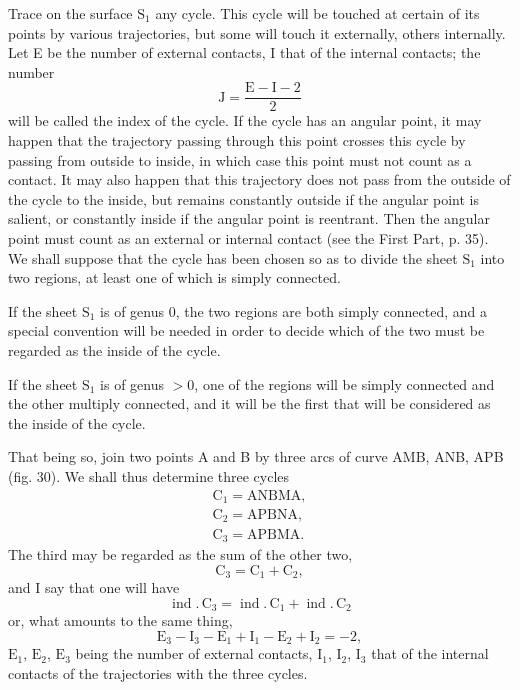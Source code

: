 \documentclass[11pt]{article}
\begin{document}
Trace on the surface $\mathrm{S}_1$ any cycle. This cycle will be touched at certain of its points by various trajectories, but some will touch it externally, others internally. Let E be the number of external contacts, I that of the internal contacts; the number
\[
\mathrm{J}=\frac{\mathrm{E}-\mathrm{I}-2}{2}
\]
will be called the index of the cycle. If the cycle has an angular point, it may happen that the trajectory passing through this point crosses this cycle by passing from outside to inside, in which case this point must not count as a contact. It may also happen that this trajectory does not pass from the outside of the cycle to the inside, but remains constantly outside if the angular point is salient, or constantly inside if the angular point is reentrant. Then the angular point must count as an external or internal contact (see the First Part, p. 35). We shall suppose that the cycle has been chosen so as to divide the sheet $\mathrm{S}_1$ into two regions, at least one of which is simply connected.

If the sheet $\mathrm{S}_1$ is of genus 0, the two regions are both simply connected, and a special convention will be needed in order to decide which of the two must be regarded as the inside of the cycle.

If the sheet $\mathrm{S}_1$ is of genus $>0$, one of the regions will be simply connected and the other multiply connected, and it will be the first that will be considered as the inside of the cycle.

That being so, join two points A and B by three arcs of curve AMB, ANB, APB (fig. 30). We shall thus determine three cycles
\[
\begin{gathered}
\mathrm{C}_1=\mathrm{ANBMA},\\
\mathrm{C}_2=\mathrm{APBNA},\\
\mathrm{C}_3=\mathrm{APBMA}.
\end{gathered}
\]
The third may be regarded as the sum of the other two,
\[
\mathrm{C}_3=\mathrm{C}_1+\mathrm{C}_2,
\]
and I say that one will have
\[
\operatorname{ind}.\,\mathrm{C}_3=\operatorname{ind}.\,\mathrm{C}_1+\operatorname{ind}.\,\mathrm{C}_2
\]
or, what amounts to the same thing,
\begin{equation}\tag{1}
\mathrm{E}_3-\mathrm{I}_3-\mathrm{E}_1+\mathrm{I}_1-\mathrm{E}_2+\mathrm{I}_2=-2,
\end{equation}
$\mathrm{E}_1$, $\mathrm{E}_2$, $\mathrm{E}_3$ being the number of external contacts, $\mathrm{I}_1$, $\mathrm{I}_2$, $\mathrm{I}_3$ that of the internal contacts of the trajectories with the three cycles.
\end{document}
